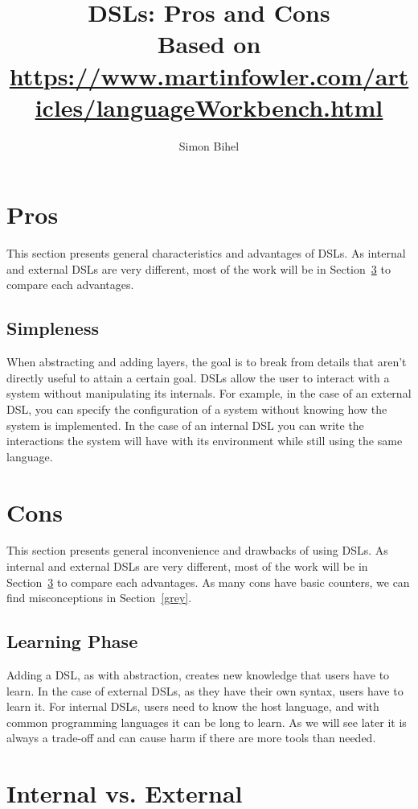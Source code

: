 \documentclass{proc}
\title{DSLs: Pros and Cons\\\large Based on \url{https://www.martinfowler.com/articles/languageWorkbench.html}}
\author{Simon Bihel}
\begin{document}
\maketitle

\section{Pros}
\label{pros}
This section presents general characteristics and advantages of DSLs. As
internal and external DSLs are very different, most of the work will be in
Section~\ref{int_vs_ext} to compare each advantages.

\subsection{Simpleness}
When abstracting and adding layers, the goal is to break from details that
aren't directly useful to attain a certain goal. DSLs allow the user to interact
with a system without manipulating its internals. For example, in the case of an
external DSL, you can specify the configuration of a system without knowing how
the system is implemented. In the case of an internal DSL you can write the
interactions the system will have with its environment while still using the
same language.


\section{Cons}
\label{cons}
This section presents general inconvenience and drawbacks of using DSLs. As
internal and external DSLs are very different, most of the work will be in
Section~\ref{int_vs_ext} to compare each advantages. As many cons have basic
counters, we can find misconceptions in Section~\ref{grey}.

\subsection{Learning Phase}
Adding a DSL, as with abstraction, creates new knowledge that users have to
learn. In the case of external DSLs, as they have their own syntax, users have
to learn it. For internal DSLs, users need to know the host language, and with
common programming languages it can be long to learn. As we will see later it is
always a trade-off and can cause harm if there are more tools than needed.


\section{Internal vs. External}
\label{int_vs_ext}
\end{document}
